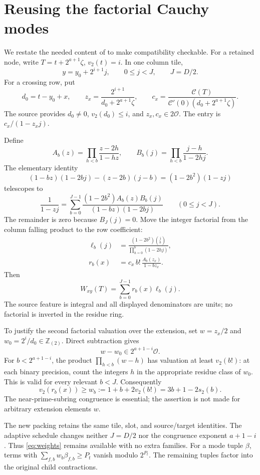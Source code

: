 \documentclass[11pt,letterpaper]{article}
\numberwithin{equation}{section}
\theoremstyle{definition}\newtheorem{definition}[theorem]{Definition}
\theoremstyle{remark}\newtheorem{remark}[theorem]{Remark}
\newcommand{\Ocal}{\mathcal O}
\begin{document}
\section{Reusing the factorial Cauchy modes}
\label{sec:cauchy}

We restate the needed content of \cite{cauchypacket} to make compatibility
checkable. For a retained node, write $T=t+2^{a+1}\zeta$, $v_2(t)=i$.
In one column tile,
\[
 y=y_0+2^{i+1}j,\qquad 0\le j<J,\qquad J=D/2.
\]
For a crossing row, put
\[
 d_0=t-y_0+x,\qquad
 z_x=\frac{2^{i+1}}{d_0+2^{a+1}\zeta},\qquad
 c_x=\frac{\mathcal C(T)}
           {\mathcal C'(0)(d_0+2^{a+1}\zeta)}.
\]
The source provides $d_0\ne0$, $v_2(d_0)\le i$, and $z_x,c_x\in2\Ocal$.
The entry is $c_x/(1-z_xj)$.

Define
\[
 A_b(z)=\prod_{h<b}\frac{z-2h}{1-hz},
 \qquad
 B_b(j)=\prod_{h<b}\frac{j-h}{1-2hj}.
\]
The elementary identity
\[
 (1-bz)(1-2bj)-(z-2b)(j-b)
       =(1-2b^2)(1-zj)
\]
telescopes to
\[
 \frac1{1-zj}
 =\sum_{b=0}^{J-1}
 \frac{(1-2b^2)A_b(z)B_b(j)}
      {(1-bz)(1-2bj)}
 \qquad(0\le j<J).
\]
The remainder is zero because $B_J(j)=0$. Move the integer factorial
from the column falling product to the row coefficient:
\begin{align}
 \ell_b(j)&=
 \frac{(1-2b^2)\binom jb}{\prod_{h=0}^b(1-2hj)},\\
 r_b(x)&=c_x\,b!\,\frac{A_b(z_x)}{1-bz_x}.
\end{align}
Then
\[
 W_{xy}(T)=\sum_{b=0}^{J-1}r_b(x)\ell_b(j).
\]
The source feature is integral and all displayed denominators are units;
no factorial is inverted in the residue ring.

To justify the second factorial valuation over the extension, set
$w=z_x/2$ and $w_0=2^i/d_0\in\mathbb Z_{(2)}$. Direct subtraction gives
\[
 w-w_0\in2^{a+1-i}\Ocal.
\]
For $b<2^{a+1-i}$, the product
$\prod_{h<b}(w-h)$ has valuation at least $v_2(b!)$:
at each binary precision, count the integers $h$ in the appropriate
residue class of $w_0$. This is valid for every relevant $b<J$.
Consequently
\begin{equation}
 v_2(r_b(x))\ge
 w_b:=1+b+2v_2(b!)=3b+1-2s_2(b).
 \label{eq:weights}
\end{equation}
The near-prime-subring congruence is essential; the assertion is not
made for arbitrary extension elements $w$.

The new packing retains the same tile, slot, and source/target identities.
The adaptive schedule changes neither $J=D/2$ nor the congruence exponent
$a+1-i$. Thus \eqref{eq:weights} remains available with no extra families.
For a mode tuple $\beta$, terms with
$\sum_{f,b}w_b\beta_{f,b}\ge P_t$ vanish modulo $2^{P_t}$.
The remaining tuples factor into the original child contractions.
\end{document}
